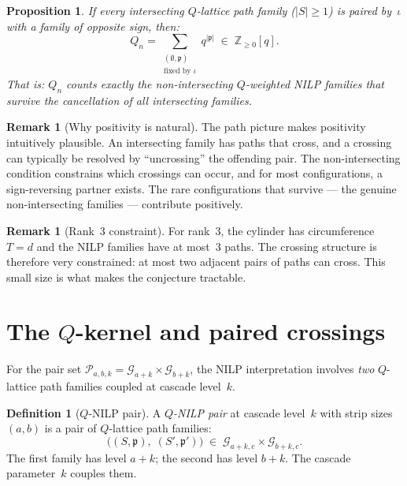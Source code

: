 \documentclass[11pt]{article}
\newcommand{\Z}{\mathbb{Z}}
\theoremstyle{plain}
\newtheorem{proposition}[theorem]{Proposition}
\theoremstyle{definition}
\newtheorem{definition}[theorem]{Definition}
\newtheorem{remark}[theorem]{Remark}
\begin{document}
\begin{proposition}
\label{prop:non-intersecting-survive}
If every intersecting $Q$-lattice path family
($|S| \geq 1$) is paired by~$\iota$ with a family of
opposite sign, then:
\[
  Q_n = \sum_{\substack{(\emptyset, \mathfrak{p}) \\
    \text{fixed by } \iota}}
    q^{|\mathfrak{p}|}
  \;\in\; \Z_{\geq 0}[q].
\]
That is: $Q_n$ counts exactly the non-intersecting
$Q$-weighted NILP families that survive the cancellation
of all intersecting families.
\end{proposition}

\begin{remark}[Why positivity is natural]
\label{rem:why-positive}
The path picture makes positivity intuitively plausible.
An intersecting family has paths that cross, and a crossing
can typically be resolved by ``uncrossing'' the offending
pair.  The non-intersecting condition constrains which
crossings can occur, and for most configurations, a
sign-reversing partner exists.  The rare configurations
that survive --- the genuine non-intersecting families ---
contribute positively.
\end{remark}

\begin{remark}[Rank~$3$ constraint]
\label{rem:rank3}
For rank~$3$, the cylinder has circumference~$T = d$ and
the NILP families have at most~$3$ paths.  The crossing
structure is therefore very constrained: at most two
adjacent pairs of paths can cross.  This small size is
what makes the conjecture tractable.
\end{remark}


\section{The $Q$-kernel and paired crossings}
\label{sec:paired-crossings}

For the pair set $\mathcal{P}_{a,b,k}
= \mathcal{G}_{a+k} \times \mathcal{G}_{b+k}$, the NILP
interpretation involves \emph{two} $Q$-lattice path
families coupled at cascade level~$k$.

\begin{definition}[$Q$-NILP pair]
\label{def:Q-NILP-pair}
A \emph{$Q$-NILP pair} at cascade level~$k$ with strip
sizes $(a,b)$ is a pair of $Q$-lattice path families:
\[
  \bigl((S, \mathfrak{p}),\; (S', \mathfrak{p}')\bigr)
  \;\in\;
  \mathcal{G}_{a+k,c} \times \mathcal{G}_{b+k,c}.
\]
The first family has level $a + k$; the second has level
$b + k$.  The cascade parameter~$k$ couples them.
\end{definition}
\end{document}
